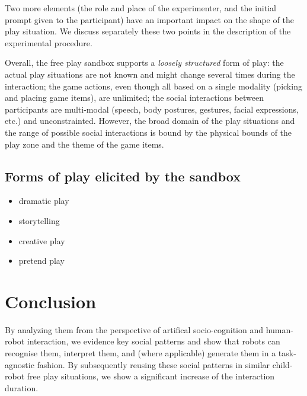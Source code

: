 \documentclass{article}
\begin{document}
Two more elements (the role and place of the experimenter, and the initial
prompt given to the participant) have an important impact on the shape of the
play situation. We discuss separately these two points in the description of the
experimental procedure.

Overall, the free play sandbox supports a \emph{loosely structured} form of play: the
actual play situations are not known and might change several times during the
interaction; the game actions, even though all based on a single modality (picking and
placing game items), are unlimited; the social interactions between participants
are multi-modal (speech, body postures, gestures, facial expressions, etc.) and
unconstrainted. However, the broad domain of the play situations and the range of
possible social interactions is bound by the physical bounds of the play zone
and the theme of the game items.

\subsection{Forms of play elicited by the sandbox}

\begin{itemize}
    \item dramatic play
    \item storytelling
    \item creative play
    \item pretend play
\end{itemize}

\section{Conclusion}


By analyzing them from the
perspective of artifical socio-cognition and human-robot interaction, we
evidence key social patterns and show that robots can recognise them,
interpret them, and (where applicable) generate them in a task-agnostic
fashion. By subsequently reusing these social patterns in similar
child-robot free play situations, we show a significant increase of the
interaction duration.




\end{document}
